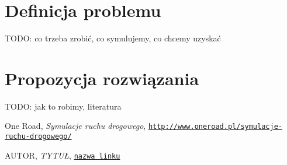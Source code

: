 \documentclass[a4paper,12pt]{article}
\begin{document}
	\section{Definicja problemu}
	TODO: co trzeba zrobić, co symulujemy, co chcemy uzyskać
	
	\section{Propozycja rozwiązania}
	TODO: jak to robimy, literatura
	
	\pagebreak
	\begin{thebibliography}{15}
		One Road, \textit{Symulacje ruchu drogowego},
		\texttt{\href{http://www.oneroad.pl/symulacje-ruchu-drogowego/}{http://www.oneroad.pl/symulacje-ruchu-drogowego/}}
		
		AUTOR, \textit{TYTUŁ},
		\texttt{\href{LINK}{nazwa linku}}
		
	\end{thebibliography}
	
\end{document}
